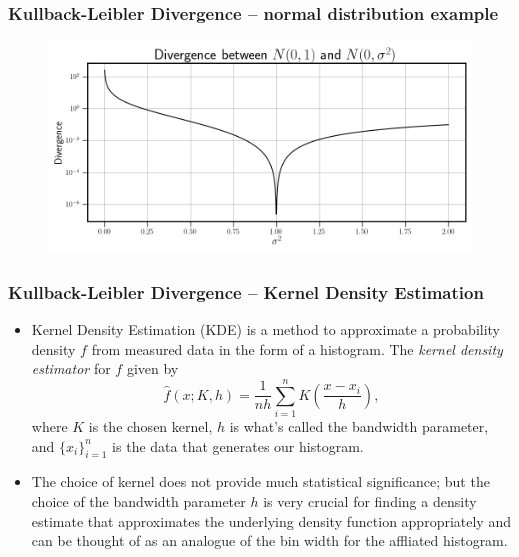 \documentclass[11pt,aspectratio=169]{beamer}
\newcommand{\parens}[1]{\left(#1\right)}
\begin{document}
    \begin{frame}
        \frametitle{Kullback-Leibler Divergence -- normal distribution example}
        \begin{figure}
            \centering
            \includegraphics[width=\textwidth]{../Figures/divergence_example.png}
        \end{figure}
    \end{frame}

    \begin{frame}
        \frametitle{Kullback-Leibler Divergence -- Kernel Density Estimation}
        \begin{itemize}
            \item 
            Kernel Density Estimation (KDE) is a method to approximate a probability density 
            $f$ from measured data in the form 
            of a histogram. The \emph{kernel density estimator} for $f$
            given by
            \begin{equation}
                \hat{f}(x; K, h) = \frac{1}{nh}\sum_{i = 1}^n K\parens{\frac{x - x_i}{h}},
            \end{equation}
            where $K$ is the chosen kernel, $h$ is what's called the bandwidth parameter, and 
            $\{x_i\}_{i=1}^n$ is the data that generates our histogram. 
            \item 
            The choice of kernel does not provide much statistical significance; 
            but the choice of the bandwidth parameter $h$ is very crucial for finding a density estimate
            that approximates the underlying density function appropriately and can be thought of as an 
            analogue of the bin width for the affliated histogram.
        \end{itemize}
    \end{frame}
\end{document}

